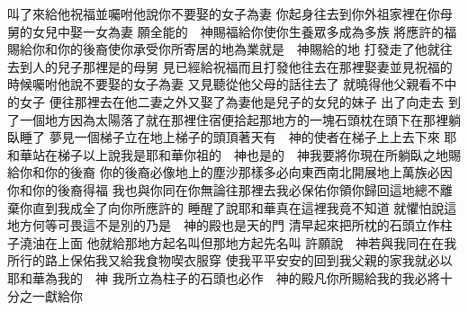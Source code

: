 \bchapter%
叫了來\chientien 給他祝福\yuentien 並囑咐他說\chientien 你不要娶的女子為妻\chuan 
{}你起身往去\chientien 到你外祖家裡\chientien 在你母舅的女兒中\chientien 娶一女為妻\chuan 
{}願全能的　神賜福給你\chientien 使你生養眾多\chientien 成為多族\chientien 
{}將應許的福賜給你\chientien 和你的後裔\chientien 使你承受你所寄居的地為業\chientien 就是　神賜給的地\chuan 
{}打發走了\chientien 他就往去\chientien 到人的兒子那裡\yuentien{}是的母舅\chuan 
{}見已經給祝福\chientien 而且打發他往去\chientien 在那裡娶妻\chientien 並見祝福的時候囑咐他說\chientien 不要娶的女子為妻\yuentien 
{}又見聽從他父母的話\chientien 往去了\yuentien 
{}就曉得他父親看不中的女子\chientien 
{}便往那裡去\chientien 在他二妻之外\chientien 又娶了為妻\yuentien 他是兒子的女兒\chientien{}的妹子\chuan\Chuan
{}出了向走去\chuan 
{}到了一個地方\chientien 因為太陽落了\chientien 就在那裡住宿\yuentien 便拾起那地方的一塊石頭\chientien 枕在頭下\chientien 在那裡躺臥睡了\chuan 
{}夢見一個梯子立在地上\chientien 梯子的頭頂著天\chientien 有　神的使者在梯子上\chientien 上去下來\chuan 
{}耶和華站在梯子以上\chientien{}說\chientien 我是耶和華你祖的　神\chientien 也是的　神\chientien 我要將你現在所躺臥之地賜給你\chientien 和你的後裔\yuentien 
{}你的後裔必像地上的塵沙那樣多\chientien 必向東西南北開展\yuentien 地上萬族必因你和你的後裔得福\yuentien 
{}我也與你同在\chientien 你無論往那裡去\chientien 我必保佑你\chientien 領你歸回這地\chientien 總不離棄你\chientien 直到我成全了向你所應許的\chuan 
{}睡醒了\chientien 說\chientien 耶和華真在這裡\chientien 我竟不知道\chuan 
{}就懼怕說\chientien 這地方何等可畏\chientien 這不是別的\chientien 乃是　神的殿\chientien 也是天的門\chuan\Chuan
{}清早起來\chientien 把所枕的石頭立作柱子\chientien 澆油在上面\chuan 
{}他就給那地方起名\chientien 叫\yuentien{}但那地方起先名叫\chuan 
{}許願\chientien 說\chientien 　神若與我同在\chientien 在我所行的路上保佑我\chientien 又給我食物喫\chientien 衣服穿\chientien 
{}使我平平安安的回到我父親的家\chientien 我就必以耶和華為我的　神\chientien 
{}我所立為柱子的石頭\chientien 也必作　神的殿\yuentien 凡你所賜給我的\chientien 我必將十分之一獻給你\chuan 

